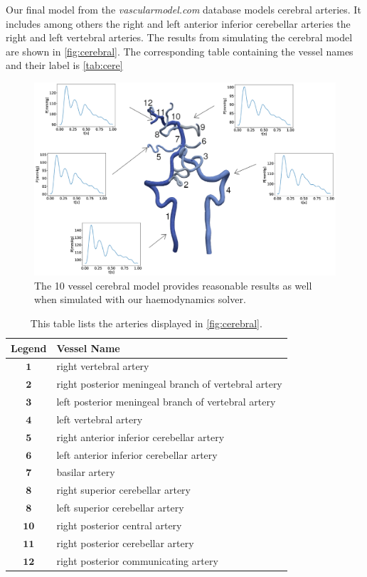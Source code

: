 \documentclass[a4paper, oneside]{discothesis}
\begin{document}
Our final model from the \emph{vascularmodel.com} database models cerebral arteries.
It includes among others the right and left anterior inferior cerebellar arteries the right and left vertebral arteries.
The results from simulating the cerebral model are shown in \autoref{fig:cerebral}.
The corresponding table containing the vessel names and their label is \autoref{tab:cere}
\begin{figure} [H]
	\centering
	\includegraphics[width=0.8\columnwidth]{figures/0053.eps}
	\caption{The 10 vessel cerebral model provides reasonable results as well when simulated with our haemodynamics solver.}
	\label{fig:cerebral}
\end{figure}
\begin{table}[H]
	\begin{center}
	\begin{tabular}{|c|l|}
			\hline
			Legend & Vessel Name\\
			\hline
			$\mathbf{1}$& right vertebral artery \\ 
			$\mathbf{2}$& right posterior meningeal branch of vertebral artery \\
			$\mathbf{3}$& left posterior meningeal branch of vertebral artery\\
			$\mathbf{4}$& left vertebral artery \\ 
			$\mathbf{5}$& right anterior inferior cerebellar artery \\
			$\mathbf{6}$& left anterior inferior cerebellar artery \\
			$\mathbf{7}$& basilar artery \\
			$\mathbf{8}$& right superior cerebellar artery \\
			$\mathbf{8}$& left superior cerebellar artery \\
			$\mathbf{10}$& right posterior central artery \\
			$\mathbf{11}$& right posterior cerebellar artery \\
			$\mathbf{12}$& right posterior communicating artery \\
			\hline
		\end{tabular}
	\end{center}
	\caption{This table lists the arteries displayed in \autoref{fig:cerebral}.}

	\label{tab:cere}
\end{table}
\end{document}
